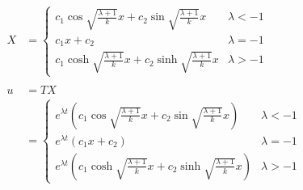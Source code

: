 \documentclass{article}
\begin{document}
\begin{align*}
  X                                       & = \begin{cases}
                                                c_1 \cos \sqrt{\frac{\lambda + 1}{k}} x + c_2 \sin \sqrt{\frac{\lambda + 1}{k}} x   & \lambda < -1 \\
                                                c_1 x + c_2                                                                         & \lambda = -1 \\
                                                c_1 \cosh \sqrt{\frac{\lambda + 1}{k}} x + c_2 \sinh \sqrt{\frac{\lambda + 1}{k}} x & \lambda > -1
                                              \end{cases}                                                                                                                                \\ \\
  u                                       & = T X                                                                                                                                                                                                                                 \\
                                          & = \begin{cases}
                                                e^{\lambda t} \left( c_1 \cos \sqrt{\frac{\lambda + 1}{k}} x + c_2 \sin \sqrt{\frac{\lambda + 1}{k}} x \right)   & \lambda < -1 \\
                                                e^{\lambda t} \left( c_1 x + c_2 \right)                                                                         & \lambda = -1 \\
                                                e^{\lambda t} \left( c_1 \cosh \sqrt{\frac{\lambda + 1}{k}} x + c_2 \sinh \sqrt{\frac{\lambda + 1}{k}} x \right) & \lambda > -1
                                              \end{cases}
\end{align*}

\setcounter{subsubsection}{10}
\subsubsection{}
\end{document}
